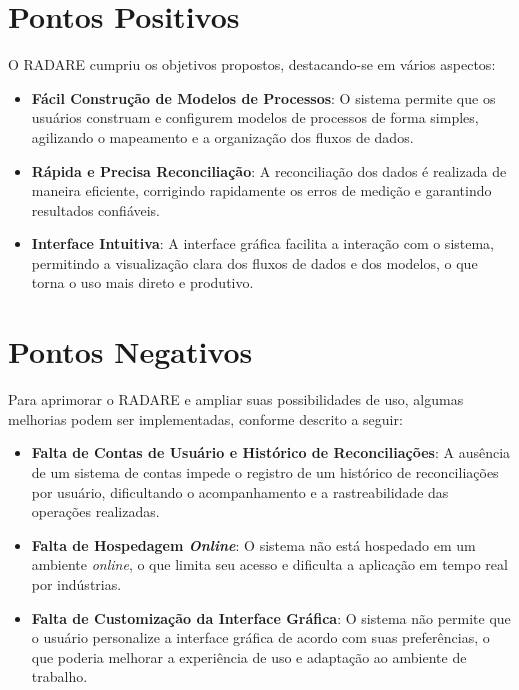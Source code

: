 \label{Cap:Conclusao}

\section{Pontos Positivos}

O RADARE cumpriu os objetivos propostos, destacando-se em vários aspectos:

\begin{itemize}
    \item \textbf{Fácil Construção de Modelos de Processos}: O sistema permite que os usuários construam e configurem modelos de processos de forma simples, agilizando o mapeamento e a organização dos fluxos de dados.

    \item \textbf{Rápida e Precisa Reconciliação}: A reconciliação dos dados é realizada de maneira eficiente, corrigindo rapidamente os erros de medição e garantindo resultados confiáveis.

    \item \textbf{Interface Intuitiva}: A interface gráfica facilita a interação com o sistema, permitindo a visualização clara dos fluxos de dados e dos modelos, o que torna o uso mais direto e produtivo.
\end{itemize}

\section{Pontos Negativos}

Para aprimorar o RADARE e ampliar suas possibilidades de uso, algumas melhorias podem ser implementadas, conforme descrito a seguir:

\begin{itemize}
    \item \textbf{Falta de Contas de Usuário e Histórico de Reconciliações}: A ausência de um sistema de contas impede o registro de um histórico de reconciliações por usuário, dificultando o acompanhamento e a rastreabilidade das operações realizadas.

    \item \textbf{Falta de Hospedagem \textit{Online}}: O sistema não está hospedado em um ambiente \textit{online}, o que limita seu acesso e dificulta a aplicação em tempo real por indústrias.

    \item \textbf{Falta de Customização da Interface Gráfica}: O sistema não permite que o usuário personalize a interface gráfica de acordo com suas preferências, o que poderia melhorar a experiência de uso e adaptação ao ambiente de trabalho.
\end{itemize}

